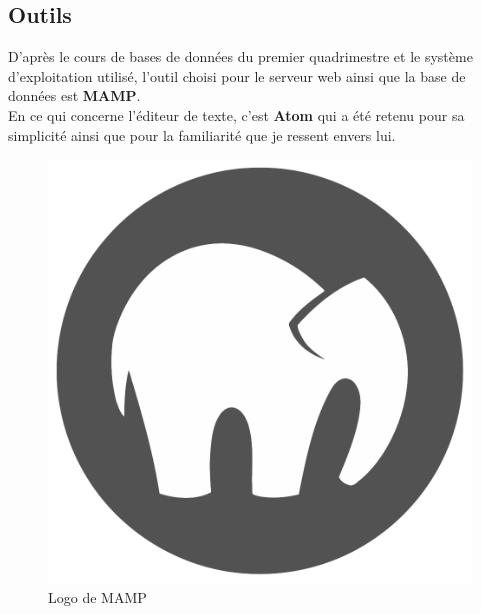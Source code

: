 \subsection{Outils}
\label{sec:outils}

D'après le cours de bases de données du premier quadrimestre et le système d'exploitation utilisé, l'outil choisi pour le serveur web ainsi que la base de données est \textbf{MAMP}.\\
En ce qui concerne l'éditeur de texte, c'est \textbf{Atom} qui a été retenu pour sa simplicité ainsi que pour la familiarité que je ressent envers lui.

\vspace{1cm}

\begin{figure}[!h]
\centering
\begin{minipage}[c]{0.4\textwidth}
  \centering
  \includegraphics[scale=0.15]
  {textures/images/tools/mamp.pdf}
\caption{Logo de MAMP}\label{mamp}
\end{minipage} \qquad
\begin{minipage}[c]{0.4\textwidth}
  \centering

\end{minipage}
\end{figure}
